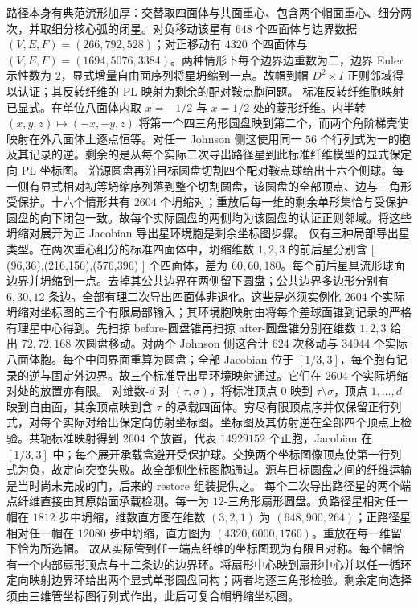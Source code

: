 \documentclass[11pt]{amsart}
\theoremstyle{definition}
\theoremstyle{remark}
\begin{document}
路径本身有典范流形加厚：交替取四面体与共面重心、包含两个帽面重心、细分两次，并取细分核心弧的闭星。对负移动该星有 $648$ 个四面体与边界数据 $(V,E,F)=(266,792,528)$；对正移动有 $4320$ 个四面体与
$(V,E,F)=(1694,5076,3384)$。两种情形下每个边界边重数为二，边界 Euler 示性数为 $2$，显式增量自由面序列将星坍缩到一点。故帽到帽 $D^2\times I$ 正则邻域得以认证；其反转纤维的 PL 映射为剩余的配对鞍点胞问题。
标准反转纤维胞映射已显式。在单位八面体内取 $x=-1/2$ 与 $x=1/2$ 处的菱形纤维。内半转 $(x,y,z)\mapsto(-x,-y,z)$ 将第一个四三角形圆盘映到第二个，而两个角阶梯壳使映射在外八面体上逐点恒等。对任一 Johnson 侧这使用同一 $56$ 个行列式为一的胞及其记录的逆。剩余的是从每个实际二次导出路径星到此标准纤维模型的显式保定向 PL 坐标图。
沿源圆盘再沿目标圆盘切割四个配对鞍点球给出十六个侧球。每一侧有显式相对初等坍缩序列落到整个切割圆盘，该圆盘的全部顶点、边与三角形受保护。十六个情形共有 $2604$ 个坍缩对；重放后每一维的剩余单形集恰与受保护圆盘的向下闭包一致。故每个实际圆盘的两侧均为该圆盘的认证正则邻域。将这些坍缩对展开为正 Jacobian 导出星环境胞是剩余坐标图步骤。
仅有三种局部导出星类型。在两次重心细分的标准四面体中，坍缩维数 $1,2,3$ 的前后星分别含
[
(96,36),\qquad(216,156),\qquad(576,396)
]
个四面体，差为 $60,60,180$。每个前后星具流形球面边界并坍缩到一点。去掉其公共边界在两侧留下圆盘；公共边界多边形分别有 $6,30,12$ 条边。全部有理二次导出四面体非退化。这些是必须实例化 $2604$ 个实际坍缩对坐标图的三个有限局部输入；其环境胞映射由将每个差球面锥到记录的严格有理星中心得到。先扫掠 before-圆盘锥再扫掠 after-圆盘锥分别在维数 $1,2,3$ 给出 $72,72,168$ 次圆盘移动。对两个 Johnson 侧这合计 $624$ 次移动与 $34944$ 个实际八面体胞。每个中间界面重算为圆盘；全部 Jacobian 位于 $[1/3,3]$，每个胞有记录的逆与固定外边界。故三个标准导出星环境映射通过。它们在 $2604$ 个实际坍缩对处的放置亦有限。
对维数-$d$ 对 $(\tau,\sigma)$，将标准顶点 $0$ 映到
$\tau\setminus\sigma$，顶点 $1,\ldots,d$ 映到自由面，其余顶点映到含 $\tau$ 的承载四面体。穷尽有限顶点序并仅保留正行列式，对每个实际对给出保定向仿射坐标图。坐标图及其仿射逆在全部四个顶点上检验。共轭标准映射得到 $2604$ 个放置，代表 $14929152$ 个正胞，Jacobian 在 $[1/3,3]$ 中；每个展开承载盒避开受保护球。交换两个坐标图像顶点使第一行列式为负，故定向突变失败。故全部侧坐标图胞通过。源与目标圆盘之间的纤维运输是当时尚未完成的门，后来的 restore 组装提供之。
每个二次导出路径星的两个端点纤维直接由其原始面承载检测。每一为 $12$-三角形扇形圆盘。负路径星相对任一帽在 $1812$ 步中坍缩，维数直方图在维数 $(3,2,1)$ 为 $(648,900,264)$；正路径星相对任一帽在 $12080$ 步中坍缩，直方图为
$(4320,6000,1760)$。重放在每一维留下恰为所选帽。
故从实际管到任一端点纤维的坐标图现为有限且对称。每个帽恰有一个内部扇形顶点与十二条边的边界环。将扇形中心映到扇形中心并以任一循环定向映射边界环给出两个显式单形圆盘同构；两者均逐三角形检验。剩余定向选择须由三维管坐标图行列式作出，此后可复合帽坍缩坐标图。
\end{document}
